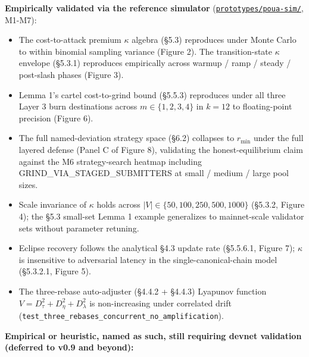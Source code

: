 \documentclass[
  11pt,
]{article}
\providecommand{\tightlist}{%
  \setlength{\itemsep}{0pt}\setlength{\parskip}{0pt}}
\begin{document}
\textbf{Empirically validated via the reference simulator}
(\href{https://github.com/ligate-io/ligate-research/tree/main/prototypes/poua-sim}{\texttt{prototypes/poua-sim/}},
M1-M7):

\begin{itemize}
\tightlist
\item
  The cost-to-attack premium \(\kappa\) algebra (§5.3) reproduces under
  Monte Carlo to within binomial sampling variance (Figure 2). The
  transition-state \(\kappa\) envelope (§5.3.1) reproduces empirically
  across warmup / ramp / steady / post-slash phases (Figure 3).
\item
  Lemma 1's cartel cost-to-grind bound (§5.5.3) reproduces under all
  three Layer 3 burn destinations across \(m \in \{1, 2, 3, 4\}\) in
  \(k = 12\) to floating-point precision (Figure 6).
\item
  The full named-deviation strategy space (§6.2) collapses to
  \(r_{\min}\) under the full layered defense (Panel C of Figure 8),
  validating the honest-equilibrium claim against the M6 strategy-search
  heatmap including GRIND\_VIA\_STAGED\_SUBMITTERS at small / medium /
  large pool sizes.
\item
  Scale invariance of \(\kappa\) holds across
  \(|V| \in \{50, 100, 250, 500, 1000\}\) (§5.3.2, Figure 4); the §5.3
  small-set Lemma 1 example generalizes to mainnet-scale validator sets
  without parameter retuning.
\item
  Eclipse recovery follows the analytical §4.3 update rate (§5.5.6.1,
  Figure 7); \(\kappa\) is insensitive to adversarial latency in the
  single-canonical-chain model (§5.3.2.1, Figure 5).
\item
  The three-rebase auto-adjuster (§4.4.2 + §4.4.3) Lyapunov function
  \(V = D_\tau^2 + D_\eta^2 + D_\lambda^2\) is non-increasing under
  correlated drift
  (\texttt{test\_three\_rebases\_concurrent\_no\_amplification}).
\end{itemize}

\textbf{Empirical or heuristic, named as such, still requiring devnet
validation (deferred to v0.9 and beyond):}
\end{document}
